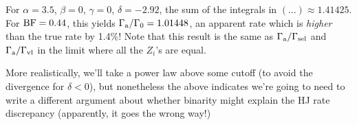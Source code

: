 \documentclass[12pt,modern]{aastex61}
\begin{document}
For $\alpha = 3.5$, $\beta=0$, $\gamma=0$, $\delta=-2.92$, the sum of the 
integrals in $(\ldots)\approx 1.41425$. %
For ${\rm BF}=0.44$, this yields $\Gamma_{\rm a}/\Gamma_0 = 1.01448$, an 
apparent rate which is {\it higher} than the true rate by 1.4\%!
Note that this result is the same as $\Gamma_{\rm a}/\Gamma_{\rm sel}$ and 
$\Gamma_{\rm a}/\Gamma_{\rm vl}$ in the limit where all the $Z_i$'s are equal.

More realistically, we'll take a power law above some cutoff (to avoid the 
divergence for $\delta<0$), but nonetheless the above indicates we're going to 
need to write a different argument about whether binarity might explain the HJ 
rate discrepancy (apparently, it goes the wrong way!)



\newpage
                            
 
\end{document}
